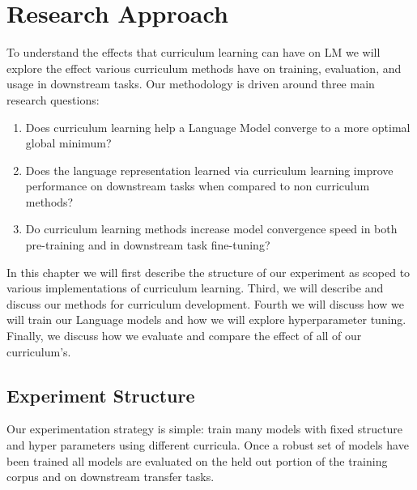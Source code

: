 \chapter{Research Approach}
To understand the effects that curriculum learning can have on LM we will explore the effect various curriculum methods have on training, evaluation, and usage in downstream tasks. Our methodology is driven around three main research questions:
\begin{enumerate}
\item Does curriculum learning help a Language Model converge to a more optimal global minimum? 
\item Does the language representation learned via curriculum learning improve performance on downstream tasks when compared to non curriculum methods?
\item  Do curriculum learning methods increase model convergence speed in both pre-training and in downstream task fine-tuning?
\end{enumerate}
In this chapter we will first describe the structure of our experiment as scoped to various implementations of curriculum learning. Third, we will describe and discuss our methods for curriculum development. Fourth we will discuss how we will train our Language models and how we will explore hyperparameter tuning. Finally, we  discuss how we evaluate and compare the effect of all of our curriculum's.
\section{Experiment Structure}
Our experimentation strategy is simple: train many models with fixed structure and hyper parameters using different curricula. Once a robust set of models have been trained all models are evaluated on the held out portion of the training corpus and on downstream transfer tasks.
